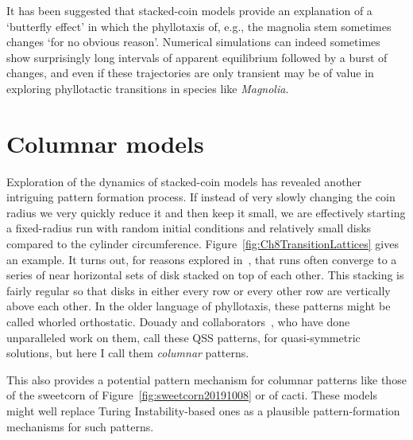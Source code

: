It has been suggested that stacked-coin models provide an explanation of a `butterfly effect' in which the phyllotaxis of, e.g., the magnolia stem sometimes changes `for no obvious reason'\autocite{zagorska-marekSignificanceGandLdislocations2016}. Numerical simulations can indeed sometimes show surprisingly long intervals of apparent equilibrium followed by a burst of changes, and even if these trajectories
are only transient may be of value in exploring phyllotactic transitions in species like \textit{Magnolia}.

\clearpage
\section{Columnar models}
\label{sec:columns}

Exploration of the dynamics of stacked-coin models has revealed another intriguing pattern formation process. If instead of very slowly changing the coin radius we very quickly reduce it and then keep it small, we are effectively starting a fixed-radius run with random initial conditions and relatively small disks compared to the cylinder circumference. Figure~\ref{fig:Ch8TransitionLattices} gives an example.
It turns out, for reasons explored in~\autocite{goleFibonacciQuasisymmetricPhyllotaxis2016}, that
runs often converge to a series of near horizontal sets of disk stacked on top of each other. This stacking is fairly regular so that disks in either every row or every other row are vertically above each other. In the older language of phyllotaxis, these patterns might be called whorled orthostatic.  Douady and collaborators~\cite{goleConvergenceDiskStacking2020}, who have done unparalleled work on them,  call these QSS patterns, for quasi-symmetric solutions, but here I call them \textit{columnar} patterns.

This also provides a potential pattern mechanism for columnar patterns like those of the sweetcorn of Figure~\ref{fig:sweetcorn20191008} or of cacti. These models might well replace Turing Instability-based ones as a plausible pattern-formation mechanisms for such patterns. 

